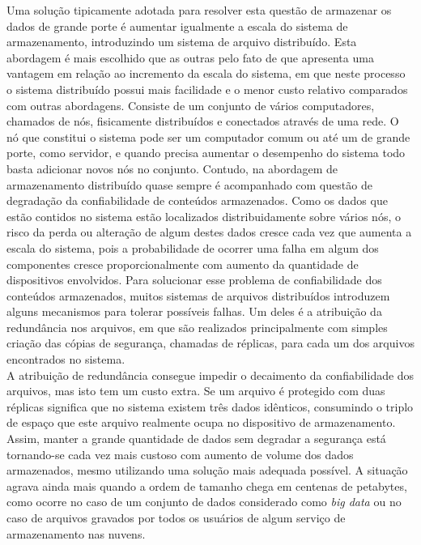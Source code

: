 	
	Uma solução tipicamente adotada  para  resolver esta questão de armazenar os dados de grande porte é aumentar igualmente a escala do sistema de armazenamento, introduzindo um sistema de arquivo distribuído.
	Esta abordagem é mais escolhido que as outras pelo fato de que apresenta uma vantagem em relação ao incremento da escala do sistema, em que neste processo o sistema distribuído possui mais facilidade e o menor custo relativo comparados com outras abordagens. 
	Consiste de um conjunto de vários computadores, chamados de nós, fisicamente distribuídos e conectados através de uma rede. 
	O nó que constitui o sistema pode ser um computador comum ou até um de grande porte, como servidor, e quando precisa aumentar o desempenho do sistema todo basta adicionar novos nós no conjunto. 
	Contudo, na abordagem de armazenamento distribuído quase sempre é  acompanhado com questão de degradação da confiabilidade de conteúdos armazenados. 
	Como os dados que estão contidos no sistema estão localizados distribuidamente sobre vários nós, o risco da perda ou alteração de algum destes dados cresce cada vez que aumenta a escala do sistema, pois a probabilidade de ocorrer uma falha em algum dos componentes cresce proporcionalmente com aumento da quantidade de dispositivos envolvidos.
	Para solucionar esse problema de confiabilidade dos conteúdos armazenados, muitos sistemas de arquivos distribuídos introduzem alguns mecanismos para tolerar possíveis falhas. 
	Um deles é a atribuição da redundância nos arquivos, em que são realizados principalmente com simples criação das cópias de segurança, chamadas de réplicas, para cada um dos arquivos encontrados no sistema. 
	\\
	
	A atribuição de redundância consegue impedir o decaimento da confiabilidade dos arquivos, mas isto tem um custo extra.
	Se um arquivo é protegido com duas réplicas significa que no sistema existem três dados idênticos, consumindo o triplo de espaço que este arquivo realmente ocupa no dispositivo de armazenamento. 
	Assim, manter a grande quantidade de dados sem degradar a segurança está tornando-se cada vez mais custoso com aumento de volume dos dados armazenados, mesmo utilizando uma solução mais adequada possível. 
	A situação agrava ainda mais quando a ordem de tamanho chega em centenas de petabytes, como ocorre no caso de um conjunto de dados considerado como \textit{big data} ou no caso de arquivos gravados por todos os usuários de algum serviço de armazenamento nas nuvens. 
	
